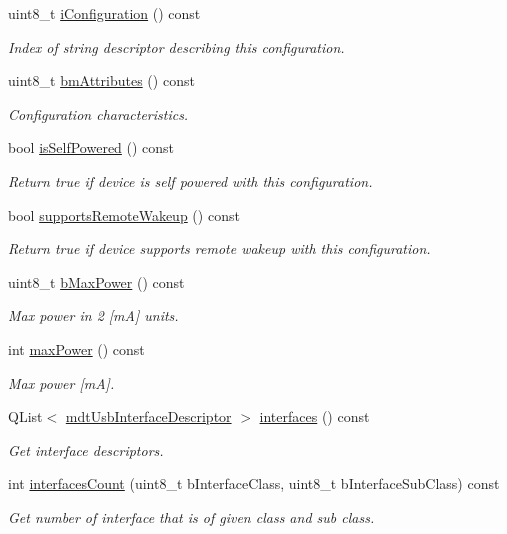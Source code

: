 \begin{DoxyCompactItemize}
uint8\-\_\-t \hyperlink{classmdt_usb_config_descriptor_a73548421ae378d7597817ba2b9bcd43e}{i\-Configuration} () const 
\begin{DoxyCompactList}\small\item\em Index of string descriptor describing this configuration. \end{DoxyCompactList}\item 
uint8\-\_\-t \hyperlink{classmdt_usb_config_descriptor_adad58801f5079560263ef8536c897c81}{bm\-Attributes} () const 
\begin{DoxyCompactList}\small\item\em Configuration characteristics. \end{DoxyCompactList}\item 
bool \hyperlink{classmdt_usb_config_descriptor_a5b8625a40bcca3025419606293b62650}{is\-Self\-Powered} () const 
\begin{DoxyCompactList}\small\item\em Return true if device is self powered with this configuration. \end{DoxyCompactList}\item 
bool \hyperlink{classmdt_usb_config_descriptor_a307f766cfd0cb917490b7d0e4dd7a3ec}{supports\-Remote\-Wakeup} () const 
\begin{DoxyCompactList}\small\item\em Return true if device supports remote wakeup with this configuration. \end{DoxyCompactList}\item 
uint8\-\_\-t \hyperlink{classmdt_usb_config_descriptor_a278d10c521bcb37c6c08400e05618955}{b\-Max\-Power} () const 
\begin{DoxyCompactList}\small\item\em Max power in 2 \mbox{[}m\-A\mbox{]} units. \end{DoxyCompactList}\item 
int \hyperlink{classmdt_usb_config_descriptor_ad5d10e65295be09359ebf3e775e2e1bd}{max\-Power} () const 
\begin{DoxyCompactList}\small\item\em Max power \mbox{[}m\-A\mbox{]}. \end{DoxyCompactList}\item 
Q\-List$<$ \hyperlink{classmdt_usb_interface_descriptor}{mdt\-Usb\-Interface\-Descriptor} $>$ \hyperlink{classmdt_usb_config_descriptor_a9fc6532f48f9f3fc2133308ced16c107}{interfaces} () const 
\begin{DoxyCompactList}\small\item\em Get interface descriptors. \end{DoxyCompactList}\item 
int \hyperlink{classmdt_usb_config_descriptor_a8d8b0185b24cb44a3755aeffe8569f1a}{interfaces\-Count} (uint8\-\_\-t b\-Interface\-Class, uint8\-\_\-t b\-Interface\-Sub\-Class) const 
\begin{DoxyCompactList}\small\item\em Get number of interface that is of given class and sub class. \end{DoxyCompactList}\end{DoxyCompactItemize}



